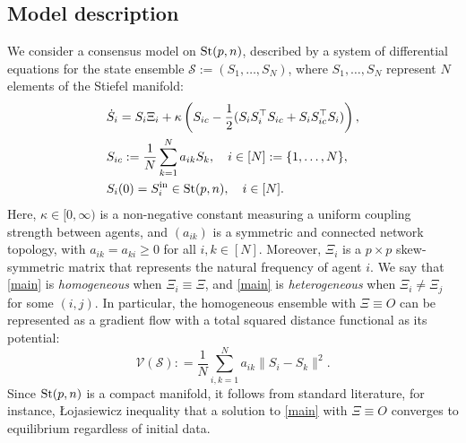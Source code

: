 \documentclass[11pt,reqno]{amsart}
\numberwithin{figure}{section}
\newcommand{\St}{  {\textup{St}}(p,n) }
\newcommand{\init}{  {\textup{in}} }
\begin{document}
\subsection{Model description}
We consider a consensus model on $\St$, described by a system of differential equations for the state ensemble $\mathcal{S} := (S_1, \ldots, S_N)$, where $S_1, \ldots, S_N$ represent $N$ elements of the Stiefel manifold:
\begin{equation} \label{main}
\begin{aligned}
&\dot S_i = S_i \Xi_i + \kappa \left( S_{ic} - \frac12( S_iS_i^\top S_{ic} + S_i S_{ic}^\top S_i) \right),\\
&S_{ic} :=\frac{1}{N}\sum_{k=1}^Na_{ik}S_k,\quad i\in [N]:=\{1,\ldots,N\},\\
&S_{i}(0)=S_i^\init \in \St,\quad i\in [N].
\end{aligned}
\end{equation} Here, $\kappa \in [0, \infty)$ is a non-negative constant measuring a uniform coupling strength between agents, and $(a_{ik})$ is a symmetric and connected network topology, with $a_{ik} = a_{ki}\geq 0$ for all $i,k\in [N]$. Moreover, $\Xi_i$ is a $p \times p$ skew-symmetric matrix that represents the natural frequency of agent $i$. We say that \eqref{main} is \textit{homogeneous} when $\Xi_i \equiv \Xi$, and \eqref{main} is \textit{heterogeneous} when $\Xi_i \neq \Xi_j$ for some $(i, j)$. In particular, the homogeneous ensemble with $\Xi\equiv O$ can be represented as a gradient flow with a total squared distance functional as its potential:
\begin{equation} \label{main-2}
\mathcal V(\mathcal S): = \frac{1}{N} \sum_{i,k=1}^N a_{ik} \|S_i- S_k\|^2.
\end{equation}
Since $\St$ is a compact manifold, it follows from standard literature, for instance, \L ojasiewicz inequality \cite{Loja}  that a solution to  \eqref{main} with $\Xi \equiv O$  converges to equilibrium  regardless of initial data. 
\end{document}
